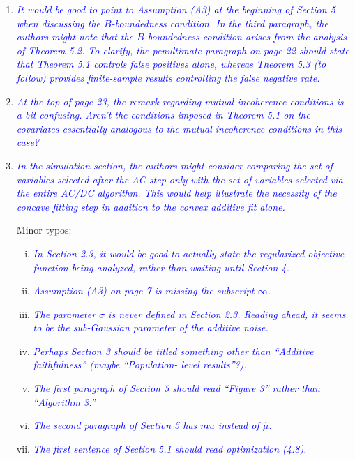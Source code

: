 \documentclass[pdftex,12pt]{article}
\let\hat\widehat
\def\reviewercomment#1{{\it\textcolor{blue}{#1}}\smallskip}
\begin{document}
\begin{enumerate}[(1)]
\item \reviewercomment{It would be good to point to Assumption (A3) at the beginning of
Section 5 when discussing the $B$-boundedness condition. In the third
paragraph, the authors might note that the $B$-boundedness condition
arises from the analysis of Theorem 5.2. To clarify, the penultimate
paragraph on page 22 should state that Theorem 5.1 controls false
positives alone, whereas Theorem 5.3 (to follow) provides
finite-sample results controlling the false negative rate.}

\item \reviewercomment{At the top
of page 23, the remark regarding mutual incoherence conditions is a
bit confusing. Aren’t the conditions imposed in Theorem 5.1 on the
covariates essentially analogous to the mutual incoherence conditions
in this case? }

\item \reviewercomment{In the simulation section, the authors might consider comparing the
set of variables selected after the AC step only with the set of
variables selected via the entire AC/DC algorithm. This would help
illustrate the necessity of the concave fitting step in addition to
the convex additive fit alone.}

Minor typos:
\begin{enumerate}[(i)]
\item \reviewercomment{In Section 2.3, it would be good to actually state the regularized
objective function being analyzed, rather than waiting until Section
4.}
\item \reviewercomment{Assumption (A3) on page 7 is missing the subscript $\infty$.}
\item \reviewercomment{The parameter $\sigma$ is never defined in Section 2.3. Reading ahead,
it seems to be the sub-Gaussian parameter of the additive noise.}
\item \reviewercomment{Perhaps Section 3 should be titled something other than ``Additive
faithfulness'' (maybe ``Population- level results''?).}
\item \reviewercomment{The first paragraph of Section 5 should read
  ``Figure 3'' rather than ``Algorithm 3.''}

\item \reviewercomment{The second paragraph of Section 5 has $m\hat{}u$ instead of $\hat\mu$.}
\item \reviewercomment{The first sentence of Section 5.1 should read optimization (4.8).}
\end{enumerate}

\end{enumerate}
\end{document}
